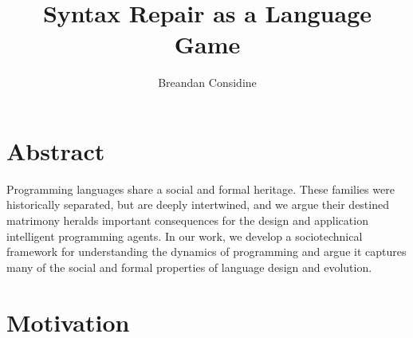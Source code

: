 \documentclass[sigplan,screen]{acmart}
\begin{document}
\title{Syntax Repair as a Language Game}

\author{Breandan Considine}

%


\renewcommand{\shortauthors}{Considine et al.}


\maketitle

\section{Abstract}

Programming languages share a social and formal heritage. These families were historically separated, but are deeply intertwined, and we argue their destined matrimony heralds important consequences for the design and application intelligent programming agents. In our work, we develop a sociotechnical framework for understanding the dynamics of programming and argue it captures many of the social and formal properties of language design and evolution.

\section{Motivation}

\end{document}
